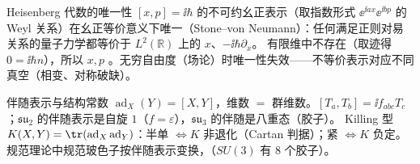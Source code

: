 \begin{结论}{Heisenberg 代数的唯一性}
$[x,p]=\ii\hbar$ 的不可约幺正表示（取指数形式 $\ee^{\ii ax}\ee^{\ii bp}$ 的 Weyl 关系）在幺正等价意义下唯一（Stone--von Neumann）：任何满足正则对易关系的量子力学都等价于 $L^2(\mathbb R)$ 上的 $x$、$-\ii\hbar\partial_x$。
有限维中不存在（取迹得 $0=\ii\hbar n$），所以 $x,p$ 。无穷自由度（场论）时唯一性失效——不等价表示对应不同真空（相变、对称破缺）。
\end{结论}

\begin{结论}{伴随表示与结构常数}
$\operatorname{ad}_X(Y)=[X,Y]$，维数 $=$ 群维数。$[T_a,T_b]=\ii f_{abc}T_c$；$\mathfrak{su}_2$ 的伴随表示是自旋 $1$（$f=\varepsilon$），$\mathfrak{su}_3$ 的伴随是八重态（胶子）。
Killing 型 $K(X,Y)=\tr(\operatorname{ad}_X\operatorname{ad}_Y)$：半单 $\iff K$ 非退化（Cartan 判据）；紧 $\iff K$ 负定。规范理论中规范玻色子按伴随表示变换，（$SU(3)$ 有 $8$ 个胶子）。
\end{结论}

